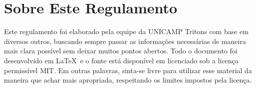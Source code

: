 \section{Sobre Este Regulamento}

Este regulamento foi elaborado pela equipe da UNICAMP Tritons com base em diversos outros, buscando sempre passar as informações necessárias de maneira mais clara possível sem deixar muitos pontos abertos. Todo o documento foi desenvolvido em \LaTeX\ e o fonte está disponível em  licenciado sob a licença permissível MIT. Em outras palavras, sinta-se livre para utilizar esse material da maneira que achar mais apropriada, respeitando os limites impostos pela licença.
